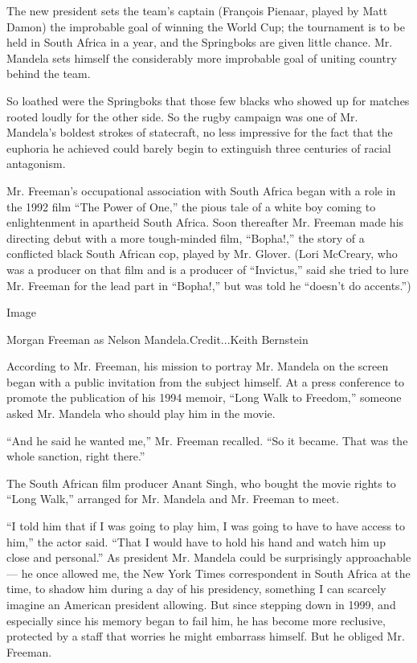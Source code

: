 The new president sets the team's captain (François Pienaar, played by
Matt Damon) the improbable goal of winning the World Cup; the tournament
is to be held in South Africa in a year, and the Springboks are given
little chance. Mr. Mandela sets himself the considerably more improbable
goal of uniting country behind the team.

So loathed were the Springboks that those few blacks who showed up for
matches rooted loudly for the other side. So the rugby campaign was one
of Mr. Mandela's boldest strokes of statecraft, no less impressive for
the fact that the euphoria he achieved could barely begin to extinguish
three centuries of racial antagonism.

Mr. Freeman's occupational association with South Africa began with a
role in the 1992 film ``The Power of One,'' the pious tale of a white
boy coming to enlightenment in apartheid South Africa. Soon thereafter
Mr. Freeman made his directing debut with a more tough-minded film,
``Bopha!,'' the story of a conflicted black South African cop, played by
Mr. Glover. (Lori McCreary, who was a producer on that film and is a
producer of ``Invictus,'' said she tried to lure Mr. Freeman for the
lead part in ``Bopha!,'' but was told he ``doesn't do accents.'')

Image

Morgan Freeman as Nelson Mandela.Credit...Keith Bernstein

According to Mr. Freeman, his mission to portray Mr. Mandela on the
screen began with a public invitation from the subject himself. At a
press conference to promote the publication of his 1994 memoir, ``Long
Walk to Freedom,'' someone asked Mr. Mandela who should play him in the
movie.

``And he said he wanted me,'' Mr. Freeman recalled. ``So it became. That
was the whole sanction, right there.''

The South African film producer Anant Singh, who bought the movie rights
to ``Long Walk,'' arranged for Mr. Mandela and Mr. Freeman to meet.

``I told him that if I was going to play him, I was going to have to
have access to him,'' the actor said. ``That I would have to hold his
hand and watch him up close and personal.'' As president Mr. Mandela
could be surprisingly approachable --- he once allowed me, the New York
Times correspondent in South Africa at the time, to shadow him during a
day of his presidency, something I can scarcely imagine an American
president allowing. But since stepping down in 1999, and especially
since his memory began to fail him, he has become more reclusive,
protected by a staff that worries he might embarrass himself. But he
obliged Mr. Freeman.

